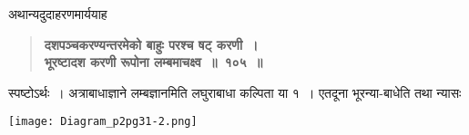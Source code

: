 \documentclass[11pt, openany]{book}
\begin{document}
\begin{sloppypar}
{\small अथान्यदुदाहरणमार्ययाह\textendash }

 \label{7.105}
\begin{quote}
{\large \textbf{{\color{purple}दशपञ्चकरण्यन्तरमेको बाहुः परश्च षट् करणी~।\\
भूरष्टादश करणी रूपोना लम्बमाचक्ष्व~॥~१०५~॥}}}
\end{quote}

स्पष्टोऽर्थः~। अत्राबाधाज्ञाने लम्बज्ञानमिति लघुराबाधा कल्पिता या १~। एतदूना भूरन्या-बाधेति तथा न्यासः

\begin{center}
\texttt{[image: Diagram\_p2pg31-2.png]}
\end{center}
\end{sloppypar}

\newpage
\end{document}

